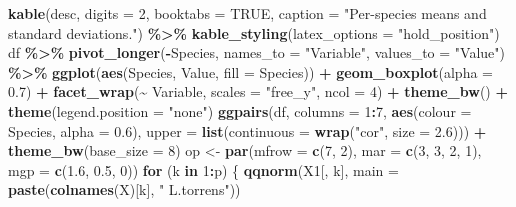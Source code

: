 \documentclass[
  11pt,
]{article}
\newenvironment{Shaded}{\begin{snugshade}}{\end{snugshade}}
\newcommand{\AttributeTok}[1]{\textcolor[rgb]{0.13,0.29,0.53}{#1}}
\newcommand{\ConstantTok}[1]{\textcolor[rgb]{0.56,0.35,0.01}{#1}}
\newcommand{\ControlFlowTok}[1]{\textcolor[rgb]{0.13,0.29,0.53}{\textbf{#1}}}
\newcommand{\DecValTok}[1]{\textcolor[rgb]{0.00,0.00,0.81}{#1}}
\newcommand{\FloatTok}[1]{\textcolor[rgb]{0.00,0.00,0.81}{#1}}
\newcommand{\FunctionTok}[1]{\textcolor[rgb]{0.13,0.29,0.53}{\textbf{#1}}}
\newcommand{\NormalTok}[1]{#1}
\newcommand{\OtherTok}[1]{\textcolor[rgb]{0.56,0.35,0.01}{#1}}
\newcommand{\SpecialCharTok}[1]{\textcolor[rgb]{0.81,0.36,0.00}{\textbf{#1}}}
\newcommand{\StringTok}[1]{\textcolor[rgb]{0.31,0.60,0.02}{#1}}
\newcounter{none} %
\begin{document}
\begin{Shaded}
\begin{Highlighting}[]
\FunctionTok{kable}\NormalTok{(desc, }\AttributeTok{digits =} \DecValTok{2}\NormalTok{, }\AttributeTok{booktabs =} \ConstantTok{TRUE}\NormalTok{,}
      \AttributeTok{caption =} \StringTok{"Per{-}species means and standard deviations."}\NormalTok{) }\SpecialCharTok{\%\textgreater{}\%}
  \FunctionTok{kable\_styling}\NormalTok{(}\AttributeTok{latex\_options =} \StringTok{"hold\_position"}\NormalTok{)}
\NormalTok{df }\SpecialCharTok{\%\textgreater{}\%}
  \FunctionTok{pivot\_longer}\NormalTok{(}\SpecialCharTok{{-}}\NormalTok{Species, }\AttributeTok{names\_to =} \StringTok{"Variable"}\NormalTok{, }\AttributeTok{values\_to =} \StringTok{"Value"}\NormalTok{) }\SpecialCharTok{\%\textgreater{}\%}
  \FunctionTok{ggplot}\NormalTok{(}\FunctionTok{aes}\NormalTok{(Species, Value, }\AttributeTok{fill =}\NormalTok{ Species)) }\SpecialCharTok{+}
  \FunctionTok{geom\_boxplot}\NormalTok{(}\AttributeTok{alpha =} \FloatTok{0.7}\NormalTok{) }\SpecialCharTok{+}
  \FunctionTok{facet\_wrap}\NormalTok{(}\SpecialCharTok{\textasciitilde{}}\NormalTok{ Variable, }\AttributeTok{scales =} \StringTok{"free\_y"}\NormalTok{, }\AttributeTok{ncol =} \DecValTok{4}\NormalTok{) }\SpecialCharTok{+}
  \FunctionTok{theme\_bw}\NormalTok{() }\SpecialCharTok{+} \FunctionTok{theme}\NormalTok{(}\AttributeTok{legend.position =} \StringTok{"none"}\NormalTok{)}
\FunctionTok{ggpairs}\NormalTok{(df, }\AttributeTok{columns =} \DecValTok{1}\SpecialCharTok{:}\DecValTok{7}\NormalTok{, }\FunctionTok{aes}\NormalTok{(}\AttributeTok{colour =}\NormalTok{ Species, }\AttributeTok{alpha =} \FloatTok{0.6}\NormalTok{),}
        \AttributeTok{upper =} \FunctionTok{list}\NormalTok{(}\AttributeTok{continuous =} \FunctionTok{wrap}\NormalTok{(}\StringTok{"cor"}\NormalTok{, }\AttributeTok{size =} \FloatTok{2.6}\NormalTok{))) }\SpecialCharTok{+}
  \FunctionTok{theme\_bw}\NormalTok{(}\AttributeTok{base\_size =} \DecValTok{8}\NormalTok{)}
\NormalTok{op }\OtherTok{\textless{}{-}} \FunctionTok{par}\NormalTok{(}\AttributeTok{mfrow =} \FunctionTok{c}\NormalTok{(}\DecValTok{7}\NormalTok{, }\DecValTok{2}\NormalTok{), }\AttributeTok{mar =} \FunctionTok{c}\NormalTok{(}\DecValTok{3}\NormalTok{, }\DecValTok{3}\NormalTok{, }\DecValTok{2}\NormalTok{, }\DecValTok{1}\NormalTok{), }\AttributeTok{mgp =} \FunctionTok{c}\NormalTok{(}\FloatTok{1.6}\NormalTok{, }\FloatTok{0.5}\NormalTok{, }\DecValTok{0}\NormalTok{))}
\ControlFlowTok{for}\NormalTok{ (k }\ControlFlowTok{in} \DecValTok{1}\SpecialCharTok{:}\NormalTok{p) \{}
  \FunctionTok{qqnorm}\NormalTok{(X1[, k], }\AttributeTok{main =} \FunctionTok{paste}\NormalTok{(}\FunctionTok{colnames}\NormalTok{(X)[k], }\StringTok{"  L.torrens"}\NormalTok{))}

\end{Highlighting}
\end{Shaded}
\end{document}
